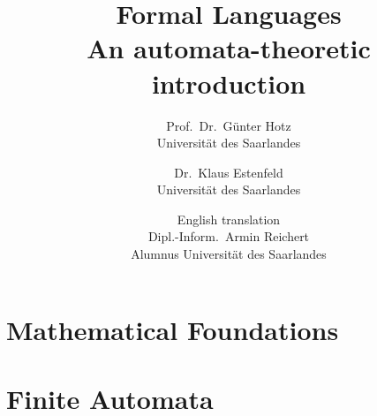 \documentclass[a4paper]{amsbook}
\begin{document}
\title{
	Formal Languages\\
	An automata-theoretic introduction}

\author{
	Prof.\ Dr.\ G\"unter Hotz\\
	Universit\"at des Saarlandes
\and
	Dr.\ Klaus Estenfeld\\
	Universit\"at des Saarlandes
\and
	English translation\\
	Dipl.-Inform.\ Armin Reichert\\
	Alumnus Universit\"at des Saarlandes
}

\maketitle


\tableofcontents


\chapter{Mathematical Foundations}







\chapter{Finite Automata}






\end{document}
